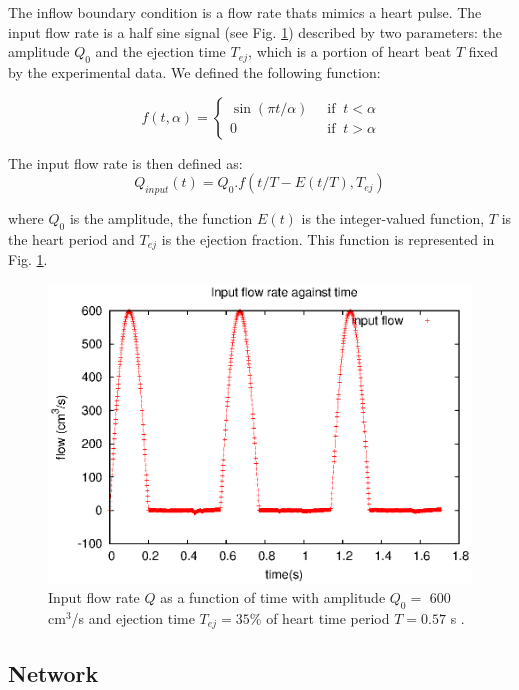 \documentclass{config}
\begin{document}
The inflow boundary condition is a flow rate thats mimics a heart pulse. The input flow rate is a half sine signal (see Fig. \ref{input_flow_rate}) described by two parameters: the amplitude $Q_0$ and the ejection time $T_{ej}$, which is a portion of heart beat $T$ fixed by the experimental data. We defined the following function: 

\begin{equation}\
f(t,\alpha) = \left\{ \begin{array}{ll}
\displaystyle \sin (\pi t/\alpha)  & ~ \text{ if }   ~ t < \alpha \\ 
\displaystyle 0    & ~ \text{ if }   ~ t > \alpha
\end{array} \right.
\end{equation}

The input flow rate is then defined as: 
\begin{equation}
Q_{input} (t) = Q_0 .  f(t/T - E(t/T), T_{ej})
\end{equation}

where $Q_0$ is the amplitude,  the function $E(t)$ is the integer-valued function, $T$ is the heart period and $T_{ej}$ is the ejection fraction. This function is represented in Fig. \ref{input_flow_rate}.

\begin{figure}[H]
\centering
\includegraphics[scale=0.7]{Figures/input_flow.eps}
\caption{Input flow rate $Q$ as a function of time with amplitude $Q_0 =$ 600 cm$^3$/s and ejection time $T_{ej} = 35 \%$ of heart time period $T = 0.57$ s .}
\label{input_flow_rate}
\end{figure}

\subsection{Network}
\end{document}
